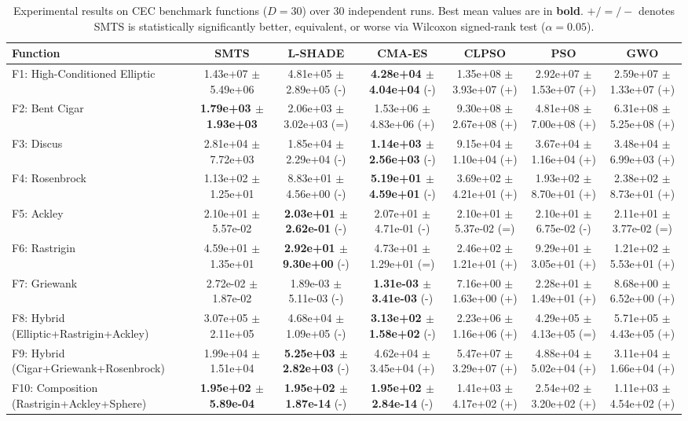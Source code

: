 \begin{table}[t]
\centering
\caption{Experimental results on CEC benchmark functions ($D = 30$) over 30 independent runs. Best mean values are in \textbf{bold}. $+/=/-$ denotes SMTS is statistically significantly better, equivalent, or worse via Wilcoxon signed-rank test ($\alpha = 0.05$).}
\label{tab:results_D30}
\scriptsize
\begin{tabular}{lcccccc}
\hline
Function & \textbf{SMTS} & \textbf{L-SHADE} & \textbf{CMA-ES} & \textbf{CLPSO} & \textbf{PSO} & \textbf{GWO} \\
\hline
F1: High-Conditioned Elliptic & 1.43e+07 $\pm$ 5.49e+06 & 4.81e+05 $\pm$ 2.89e+05 (-) & \textbf{4.28e+04 $\pm$ 4.04e+04} (-) & 1.35e+08 $\pm$ 3.93e+07 (+) & 2.92e+07 $\pm$ 1.53e+07 (+) & 2.59e+07 $\pm$ 1.33e+07 (+) \\
F2: Bent Cigar & \textbf{1.79e+03 $\pm$ 1.93e+03} & 2.06e+03 $\pm$ 3.02e+03 (=) & 1.53e+06 $\pm$ 4.83e+06 (+) & 9.30e+08 $\pm$ 2.67e+08 (+) & 4.81e+08 $\pm$ 7.00e+08 (+) & 6.31e+08 $\pm$ 5.25e+08 (+) \\
F3: Discus & 2.81e+04 $\pm$ 7.72e+03 & 1.85e+04 $\pm$ 2.29e+04 (-) & \textbf{1.14e+03 $\pm$ 2.56e+03} (-) & 9.15e+04 $\pm$ 1.10e+04 (+) & 3.67e+04 $\pm$ 1.16e+04 (+) & 3.48e+04 $\pm$ 6.99e+03 (+) \\
F4: Rosenbrock & 1.13e+02 $\pm$ 1.25e+01 & 8.83e+01 $\pm$ 4.56e+00 (-) & \textbf{5.19e+01 $\pm$ 4.59e+01} (-) & 3.69e+02 $\pm$ 4.21e+01 (+) & 1.93e+02 $\pm$ 8.70e+01 (+) & 2.38e+02 $\pm$ 8.73e+01 (+) \\
F5: Ackley & 2.10e+01 $\pm$ 5.57e-02 & \textbf{2.03e+01 $\pm$ 2.62e-01} (-) & 2.07e+01 $\pm$ 4.71e-01 (-) & 2.10e+01 $\pm$ 5.37e-02 (=) & 2.10e+01 $\pm$ 6.75e-02 (-) & 2.11e+01 $\pm$ 3.77e-02 (=) \\
F6: Rastrigin & 4.59e+01 $\pm$ 1.35e+01 & \textbf{2.92e+01 $\pm$ 9.30e+00} (-) & 4.73e+01 $\pm$ 1.29e+01 (=) & 2.46e+02 $\pm$ 1.21e+01 (+) & 9.29e+01 $\pm$ 3.05e+01 (+) & 1.21e+02 $\pm$ 5.53e+01 (+) \\
F7: Griewank & 2.72e-02 $\pm$ 1.87e-02 & 1.89e-03 $\pm$ 5.11e-03 (-) & \textbf{1.31e-03 $\pm$ 3.41e-03} (-) & 7.16e+00 $\pm$ 1.63e+00 (+) & 2.28e+01 $\pm$ 1.49e+01 (+) & 8.68e+00 $\pm$ 6.52e+00 (+) \\
F8: Hybrid (Elliptic+Rastrigin+Ackley) & 3.07e+05 $\pm$ 2.11e+05 & 4.68e+04 $\pm$ 1.09e+05 (-) & \textbf{3.13e+02 $\pm$ 1.58e+02} (-) & 2.23e+06 $\pm$ 1.16e+06 (+) & 4.29e+05 $\pm$ 4.13e+05 (=) & 5.71e+05 $\pm$ 4.43e+05 (+) \\
F9: Hybrid (Cigar+Griewank+Rosenbrock) & 1.99e+04 $\pm$ 1.51e+04 & \textbf{5.25e+03 $\pm$ 2.82e+03} (-) & 4.62e+04 $\pm$ 3.45e+04 (+) & 5.47e+07 $\pm$ 3.29e+07 (+) & 4.88e+04 $\pm$ 5.02e+04 (+) & 3.11e+04 $\pm$ 1.66e+04 (+) \\
F10: Composition (Rastrigin+Ackley+Sphere) & \textbf{1.95e+02 $\pm$ 5.89e-04} & \textbf{1.95e+02 $\pm$ 1.87e-14} (-) & \textbf{1.95e+02 $\pm$ 2.84e-14} (-) & 1.41e+03 $\pm$ 4.17e+02 (+) & 2.54e+02 $\pm$ 3.20e+02 (+) & 1.11e+03 $\pm$ 4.54e+02 (+) \\
\hline
\end{tabular}
\end{table}